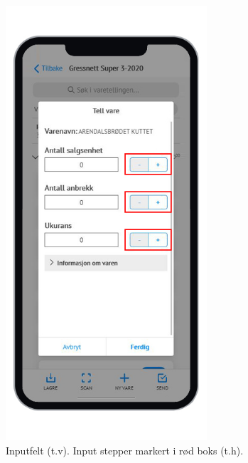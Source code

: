 \begin{figure}[H] 
    \centering
    \includegraphics[width=75mm]{figures/Design-utforming/universell-utforming.jpg}
    \caption{Inputfelt (t.v). Input stepper markert i rød boks (t.h).}
\end{figure}
